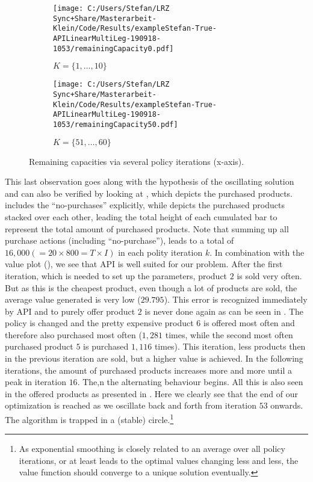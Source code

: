 \begin{figure}[H]
	\begin{subfigure}[t]{.5\textwidth}
		\centering
		\texttt{[image: C:/Users/Stefan/LRZ Sync+Share/Masterarbeit-Klein/Code/Results/exampleStefan-True-APILinearMultiLeg-190918-1053/remainingCapacity0.pdf]}
		\caption{\label{fig-adp-capacities0}$K=\{1, \dots, 10\}$}
	\end{subfigure}%
	\begin{subfigure}[t]{.5\textwidth}
		\centering
		\texttt{[image: C:/Users/Stefan/LRZ Sync+Share/Masterarbeit-Klein/Code/Results/exampleStefan-True-APILinearMultiLeg-190918-1053/remainingCapacity50.pdf]}
		\caption{\label{fig-adp-capacities50}$K=\{51, \dots, 60\}$}
	\end{subfigure}
	\caption[Remaining capacities via several policy iterations.]{\label{fig-adp-capacities} Remaining capacities via several policy iterations (x-axis).}
\end{figure}

This last observation goes along with the hypothesis of the oscillating solution and can also be verified by looking at , which depicts the purchased products.  includes the \enquote{no-purchases} explicitly, while  depicts the purchased products stacked over each other, leading the total height of each cumulated bar to represent the total amount of purchased products. Note that summing up all purchase actions (including \enquote{no-purchase}), leads to a total of $16,000 (= 20 \times 800 = T \times I)$ in each polity iteration $k$. In combination with the value plot (), we see that API is well suited for our problem. After the first iteration, which is needed to set up the parameters, product $2$ is sold very often. But as this is the cheapest product, even though a lot of products are sold, the average value generated is very low ($29.795$). This error is recognized immediately by API and to purely offer product $2$ is never done again as can be seen in . The policy is changed and the pretty expensive product $6$ is offered most often and therefore also purchased most often ($1,281$ times, while the second most often purchased product $5$ is purchased $1,116$ times). This iteration, less products then in the previous iteration are sold, but a higher value is achieved. In the following iterations, the amount of purchased products increases more and more until a peak in iteration $16$. The,n the alternating behaviour begins. All this is also seen in the offered products as presented in . Here we clearly see that the end of our optimization is reached as we oscillate back and forth from iteration $53$ onwards. The algorithm is trapped in a (stable) circle.\footnote{As exponential smoothing is closely related to an average over all policy iterations, or at least leads to the optimal values changing less and less, the value function should converge to a unique solution eventually.}

